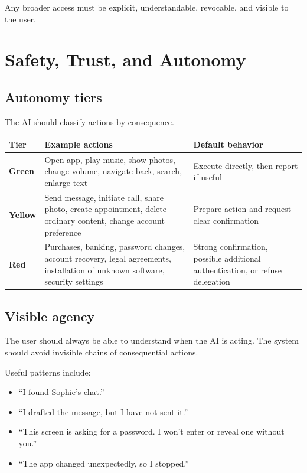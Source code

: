 \documentclass[11pt]{article}
\begin{document}
Any broader access must be explicit, understandable, revocable, and visible to the user.

\section{Safety, Trust, and Autonomy}

\subsection{Autonomy tiers}
The AI should classify actions by consequence.

\begin{longtable}{>{\bfseries}p{} p{} p{}}
\toprule
Tier & Example actions & Default behavior \\
\midrule
Green & Open app, play music, show photos, change volume, navigate back, search, enlarge text & Execute directly, then report if useful \\
\addlinespace
Yellow & Send message, initiate call, share photo, create appointment, delete ordinary content, change account preference & Prepare action and request clear confirmation \\
\addlinespace
Red & Purchases, banking, password changes, account recovery, legal agreements, installation of unknown software, security settings & Strong confirmation, possible additional authentication, or refuse delegation \\
\bottomrule
\end{longtable}

\subsection{Visible agency}
The user should always be able to understand when the AI is acting. The system should avoid invisible chains of consequential actions.

Useful patterns include:

\begin{itemize}[leftmargin=*]
    \item ``I found Sophie's chat.''
    \item ``I drafted the message, but I have not sent it.''
    \item ``This screen is asking for a password. I won't enter or reveal one without you.''
    \item ``The app changed unexpectedly, so I stopped.''
\end{itemize}
\end{document}
